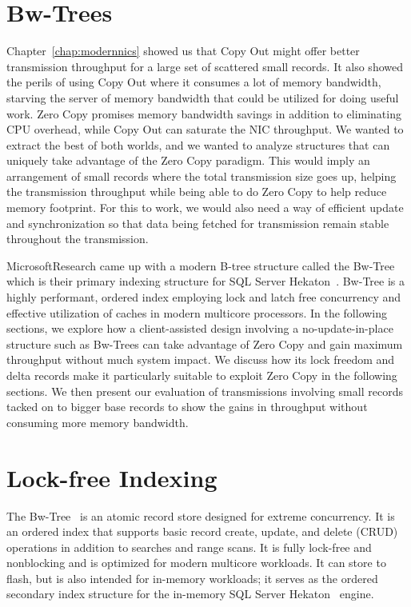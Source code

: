 \section{Bw-Trees}
Chapter~\ref{chap:modernnics} showed us that Copy Out might offer better transmission throughput for a large set 
of scattered small records. It also showed the perils of using Copy Out where it consumes a lot of memory bandwidth, 
starving the server of memory bandwidth that could be utilized for doing useful work.
Zero Copy promises memory bandwidth savings in addition to eliminating CPU overhead, 
while Copy Out can saturate the NIC throughput. We wanted to extract the best of both worlds, 
and we wanted to analyze structures that can uniquely take advantage of the 
Zero Copy paradigm. This would imply an arrangement of small records where the total transmission size 
goes up, helping the transmission throughput while being able to do Zero Copy to help reduce memory footprint. For this 
to work, we would also need a way of efficient update and synchronization so that data being fetched for transmission remain 
stable throughout the transmission.

Microsoft\textregistered Research came up with a modern B-tree structure called 
the Bw-Tree~\cite{bw-tree} which is their primary indexing structure for SQL Server Hekaton~\cite{hekaton}.
Bw-Tree is a highly performant, ordered index employing lock and latch free concurrency and effective utilization of caches in 
modern multicore processors. In the following sections, we explore how a client-assisted design involving a no-update-in-place 
structure such as Bw-Trees can take advantage of Zero Copy and gain maximum throughput 
without much system impact. We discuss how its lock freedom and delta records make it 
particularly suitable to exploit Zero Copy in the following sections. We then present
our evaluation of transmissions involving small records tacked on to bigger base records
to show the gains in throughput without consuming more memory bandwidth. 

\section{Lock-free Indexing}
\label{sec:bwtree-intro}
The Bw-Tree~\cite{bw-tree} is an atomic record store designed for extreme
concurrency. It is an ordered index that supports basic record create, update,
and delete (CRUD) operations in addition to searches and range scans.  It is
fully lock-free and nonblocking and is optimized for modern multicore
workloads. It can store to flash, but is also intended for in-memory
workloads; it serves as the ordered secondary index structure for the in-memory SQL
Server Hekaton~\cite{hekaton} engine.

